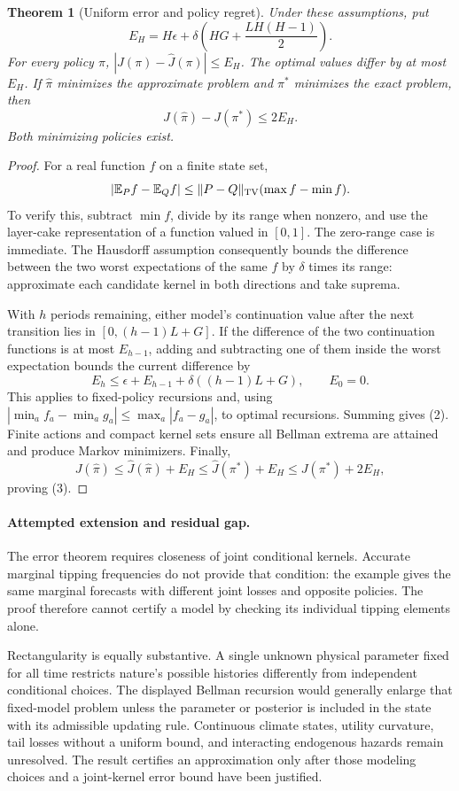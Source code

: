 \documentclass[11pt]{article}
\newtheorem{theorem}{Theorem}
\theoremstyle{definition}
\begin{document}
\begin{theorem}[Uniform error and policy regret]
Under these assumptions, put
\[
 E_H=H\epsilon+
 \delta\left(HG+\frac{LH(H-1)}2\right).
 \tag{2}
\]
For every policy $\pi$, $|J(\pi)-\widehat J(\pi)|\leq E_H$. The optimal values differ by at most $E_H$. If $\widehat\pi$ minimizes the approximate problem and $\pi^*$ minimizes the exact problem, then
\[
 J(\widehat\pi)-J(\pi^*)\leq2E_H.
 \tag{3}
\]
Both minimizing policies exist.
\end{theorem}
\begin{proof}
For a real function $f$ on a finite state set,
\[
 |\mathbb E_Pf-\mathbb E_Qf|
 \leq\|P-Q\|_{\rm TV}(\max f-\min f).
\]
To verify this, subtract $\min f$, divide by its range when nonzero, and use the layer-cake representation of a function valued in $[0,1]$. The zero-range case is immediate. The Hausdorff assumption consequently bounds the difference between the two worst expectations of the same $f$ by $\delta$ times its range: approximate each candidate kernel in both directions and take suprema.

With $h$ periods remaining, either model's continuation value after the next transition lies in $[0,(h-1)L+G]$. If the difference of the two continuation functions is at most $E_{h-1}$, adding and subtracting one of them inside the worst expectation bounds the current difference by
\[
 E_h\leq\epsilon+E_{h-1}+\delta((h-1)L+G),\qquad E_0=0.
\]
This applies to fixed-policy recursions and, using $|\min_a f_a-\min_a g_a|\leq\max_a|f_a-g_a|$, to optimal recursions. Summing gives (2). Finite actions and compact kernel sets ensure all Bellman extrema are attained and produce Markov minimizers. Finally,
\[
 J(\widehat\pi)\leq\widehat J(\widehat\pi)+E_H
 \leq\widehat J(\pi^*)+E_H\leq J(\pi^*)+2E_H,
\]
proving (3).
\end{proof}

\paragraph{Attempted extension and residual gap.}
The error theorem requires closeness of joint conditional kernels. Accurate marginal tipping frequencies do not provide that condition: the example gives the same marginal forecasts with different joint losses and opposite policies. The proof therefore cannot certify a model by checking its individual tipping elements alone.

Rectangularity is equally substantive. A single unknown physical parameter fixed for all time restricts nature's possible histories differently from independent conditional choices. The displayed Bellman recursion would generally enlarge that fixed-model problem unless the parameter or posterior is included in the state with its admissible updating rule. Continuous climate states, utility curvature, tail losses without a uniform bound, and interacting endogenous hazards remain unresolved. The result certifies an approximation only after those modeling choices and a joint-kernel error bound have been justified.
\end{document}
